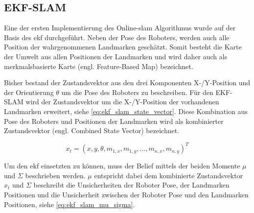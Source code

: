 

%
%
%
\subsection{EKF-SLAM}

Eine der ersten Implementierung des Online-\gls{slam} Algorithmus wurde auf der Basis des \gls{ekf} durchgeführt. Neben der Pose des Roboters, werden auch alle Position der wahrgenommenen Landmarken geschätzt. Somit besteht die Karte der Umwelt aus allen Positionen der Landmarken und wird daher auch als merkmalsbasierte Karte (engl. Feature-Based Map) bezeichnet.

Bisher bestand der Zustandsvektor aus den drei Komponenten X-/Y-Position und der Orientierung $\theta$ um die Pose des Roboters zu beschreiben. Für den EKF-SLAM wird der Zustandsvektor um die X-/Y-Position der vorhandenen Landmarken erweitert, siehe \autoref{eq:ekf_slam_state_vector}. Diese Kombination aus Pose des Roboters und Positionen der Landmarken wird als kombinierter Zustandsvektor (engl. Combined State Vector) bezeichnet.

\begin{equation}
x_t = \left( x, y, \theta, m_{1,x}, m_{1,y}, \ldots, m_{n,x}, m_{n,y} \right)^T \label{eq:ekf_slam_state_vector}
\end{equation}

Um den \gls{ekf} einsetzten zu können, muss der Belief mittels der beiden Momente $\mu$ und $\Sigma$ beschrieben werden. $\mu$ entspricht dabei dem kombinierte Zustandsvektor $x_t$ und $\Sigma$ beschreibt die Unsicherheiten der Roboter Pose, der Landmarken Positionen und die Unsicherheit zwischen der Roboter Pose und den Landmarken Positionen, siehe \autoref{eq:ekf_slam_mu_sigma}.

